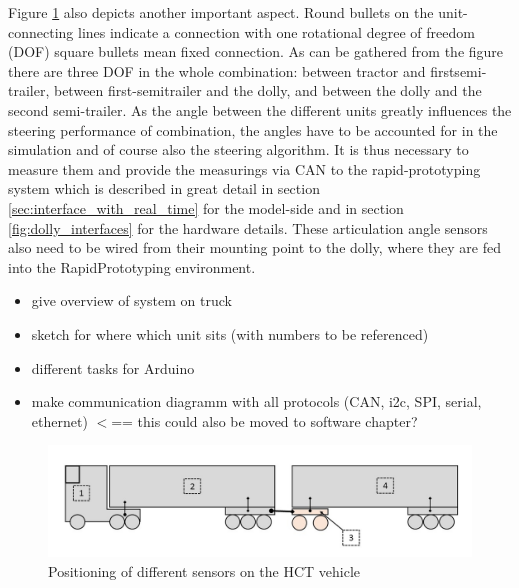 \documentclass[ExampleMasters.tex]{subfiles}
\begin{document}
Figure \ref{fig:combination_overview_with_positions} also depicts another important aspect. Round bullets on the unit-connecting lines indicate a connection with one rotational degree of freedom (DOF) square bullets mean fixed connection. As can be gathered from the figure there are three DOF in the whole combination: between tractor and firstsemi-trailer, between first-semitrailer and the dolly, and between the dolly and the second semi-trailer. As the angle between the different units greatly influences the steering performance of combination, the angles have to be accounted for in the simulation and of course also the steering algorithm. It is thus necessary to measure them and provide the measurings via CAN to the rapid-prototyping system which is described in great detail in section \ref{sec:interface_with_real_time} for the model-side and in section \ref{fig:dolly_interfaces} for the hardware details. These articulation angle sensors also need to be wired from their mounting point to the dolly, where they are fed into the RapidPrototyping environment. 


\begin{itemize}
	\item give overview of system on truck
	\item sketch for where which unit sits (with numbers to be referenced)
	\item different tasks for Arduino
	\item make communication diagramm with all protocols (CAN, i2c, SPI, serial, ethernet) $<$== this could also be moved to software chapter?
	
\end{itemize}

\begin{figure}[ph]
\centering
\includegraphics[width=1\linewidth]{figures/combination_overview_with_positions}
\caption{Positioning of different sensors on the HCT vehicle}
\label{fig:combination_overview_with_positions}
\end{figure}
\end{document}
